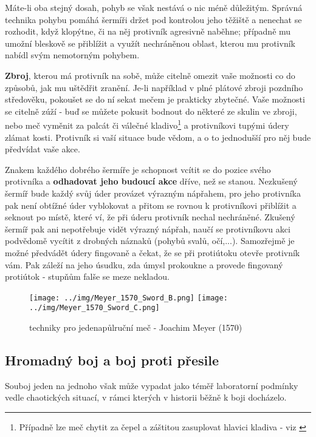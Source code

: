 Máte-li oba stejný dosah, pohyb se však nestává o nic méně důležitým. Správná technika pohybu pomáhá šermíři držet pod kontrolou jeho těžiště a nenechat se rozhodit, když klopýtne, či na něj protivník agresivně naběhne; případně mu umožní bleskově se přiblížit a využít nechráněnou oblast, kterou mu protivník nabídl svým nemotorným pohybem. 

\textbf{Zbroj}, kterou má protivník na sobě, může citelně omezit vaše možnosti co do způsobů, jak mu uštědřit zranění. Je-li například v plné plátové zbroji pozdního středověku, pokoušet se do ní sekat mečem je prakticky zbytečné. Vaše možnosti se citelně zúží - buď se můžete pokusit bodnout do některé ze skulin ve zbroji, nebo meč vyměnit za palcát či válečné kladivo\footnote{Případně lze meč chytit za čepel a záštitou zasuplovat hlavici kladiva - viz \cite{FightingWithTheGermanLongsword}} a protivníkovi tupými údery zlámat kosti. Protivník si vaší situace bude vědom, a o to jednodušší pro něj bude předvídat vaše akce.

Znakem každého dobrého šermíře je schopnost vcítit se do pozice svého protivníka a \textbf{odhadovat jeho budoucí akce} dříve, než se stanou. Nezkušený šermíř bude každý svůj úder provázet výrazným nápřahem, pro jeho protivníka pak není obtížné úder vyblokovat a přitom se rovnou k protivníkovi přiblížit a seknout po místě, které ví, že při úderu protivník nechal nechráněné. Zkušený šermíř pak ani nepotřebuje vidět výrazný nápřah, naučí se protivníkovu akci podvědomě vycítit z drobných náznaků (pohybů svalů, očí,...). Samozřejmě je možné předvádět údery fingovaně a čekat, že se při protiútoku otevře protivník vám. Pak záleží na jeho úsudku, zda úmysl prokoukne a provede fingovaný protiútok - stupňům falše se meze nekladou. 


\begin{figure}[h]\centering
    \center
    \texttt{[image: ../img/Meyer\_1570\_Sword\_B.png]}
    \texttt{[image: ../img/Meyer\_1570\_Sword\_C.png]}
    \caption{techniky pro jedenapůlruční meč - Joachim Meyer (1570) \cite{KunstDesFechtens}}
    \label{obr01:KunstDesFechtens}
    
\end{figure}

\subsection{Hromadný boj a boj proti přesile}
Souboj jeden na jednoho však může vypadat jako téměř laboratorní podmínky vedle chaotických situací, v rámci kterých v historii běžně k boji docházelo.   

